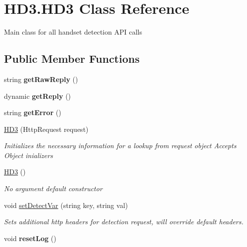 \hypertarget{class_h_d3_1_1_h_d3}{\section{H\+D3.\+H\+D3 Class Reference}
\label{class_h_d3_1_1_h_d3}
}


Main class for all handset detection A\+P\+I calls  


\subsection*{Public Member Functions}
\begin{DoxyCompactItemize}
\item 
\hypertarget{class_h_d3_1_1_h_d3_a08cdeab81f9bddbfb126a7321ea2fd8c}{string {\bfseries get\+Raw\+Reply} ()}\label{class_h_d3_1_1_h_d3_a08cdeab81f9bddbfb126a7321ea2fd8c}

\item 
\hypertarget{class_h_d3_1_1_h_d3_ad79fcc6a7b1e5d38abc7219af87b3a2f}{dynamic {\bfseries get\+Reply} ()}\label{class_h_d3_1_1_h_d3_ad79fcc6a7b1e5d38abc7219af87b3a2f}

\item 
\hypertarget{class_h_d3_1_1_h_d3_a3dc243815bb91775b05d6fb148959983}{string {\bfseries get\+Error} ()}\label{class_h_d3_1_1_h_d3_a3dc243815bb91775b05d6fb148959983}

\item 
\hyperlink{class_h_d3_1_1_h_d3_a0a238bb9c0e43132312e5c863292c577}{H\+D3} (Http\+Request request)
\begin{DoxyCompactList}\small\item\em Initializes the necessary information for a lookup from request object Accepts Object inializers \end{DoxyCompactList}\item 
\hyperlink{class_h_d3_1_1_h_d3_a6f369b558b21414a20af987df0007a75}{H\+D3} ()
\begin{DoxyCompactList}\small\item\em No argument default constructor \end{DoxyCompactList}\item 
void \hyperlink{class_h_d3_1_1_h_d3_a658104a63e4bac0a909cdcfed8c2d49b}{set\+Detect\+Var} (string key, string val)
\begin{DoxyCompactList}\small\item\em Sets additional http headers for detection request, will override default headers.\end{DoxyCompactList}\item 
\hypertarget{class_h_d3_1_1_h_d3_a92e1a5bec8573497497bb7e4082a6b5c}{void {\bfseries reset\+Log} ()}\label{class_h_d3_1_1_h_d3_a92e1a5bec8573497497bb7e4082a6b5c}


\end{DoxyCompactItemize}

